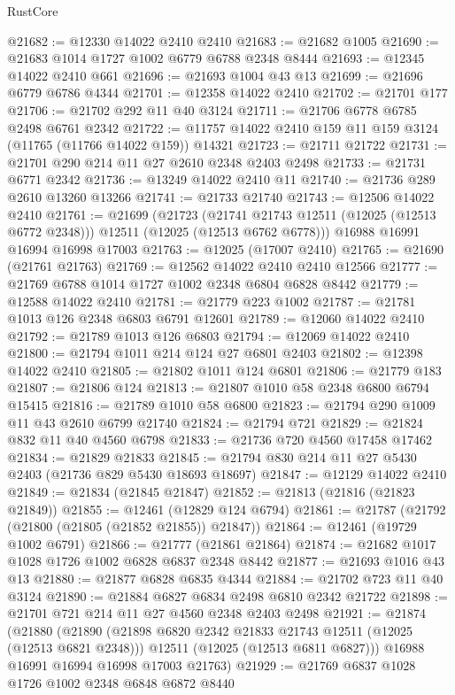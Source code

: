 \begin{lexlean}{RustCore}
\begin{coremodule}
@21682 := @12330 @14022 @2410 @2410
@21683 := @21682 @1005
@21690 := @21683 @1014 @1727 @1002 @6779 @6788 @2348 @8444
@21693 := @12345 @14022 @2410 @661
@21696 := @21693 @1004 @43 @13
@21699 := @21696 @6779 @6786 @4344
@21701 := @12358 @14022 @2410
@21702 := @21701 @177
@21706 := @21702 @292 @11 @40 @3124
@21711 := @21706 @6778 @6785 @2498 @6761 @2342
@21722 := @11757 @14022 @2410 @159 @11 @159 @3124 (@11765 (@11766 @14022 @159)) @14321
@21723 := @21711 @21722
@21731 := @21701 @290 @214 @11 @27 @2610 @2348 @2403 @2498
@21733 := @21731 @6771 @2342
@21736 := @13249 @14022 @2410 @11
@21740 := @21736 @289 @2610 @13260 @13266
@21741 := @21733 @21740
@21743 := @12506 @14022 @2410
@21761 := @21699
    (@21723
      (@21741 @21743 @12511 (@12025 (@12513 @6772 @2348)))
      @12511
      (@12025 (@12513 @6762 @6778)))
    @16988
    @16991
    @16994
    @16998
    @17003
@21763 := @12025 (@17007 @2410)
@21765 := @21690 (@21761 @21763)
@21769 := @12562 @14022 @2410 @2410 @12566
@21777 := @21769 @6788 @1014 @1727 @1002 @2348 @6804 @6828 @8442
@21779 := @12588 @14022 @2410
@21781 := @21779 @223 @1002
@21787 := @21781 @1013 @126 @2348 @6803 @6791 @12601
@21789 := @12060 @14022 @2410
@21792 := @21789 @1013 @126 @6803
@21794 := @12069 @14022 @2410
@21800 := @21794 @1011 @214 @124 @27 @6801 @2403
@21802 := @12398 @14022 @2410
@21805 := @21802 @1011 @124 @6801
@21806 := @21779 @183
@21807 := @21806 @124
@21813 := @21807 @1010 @58 @2348 @6800 @6794 @15415
@21816 := @21789 @1010 @58 @6800
@21823 := @21794 @290 @1009 @11 @43 @2610 @6799 @21740
@21824 := @21794 @721
@21829 := @21824 @832 @11 @40 @4560 @6798
@21833 := @21736 @720 @4560 @17458 @17462
@21834 := @21829 @21833
@21845 := @21794 @830 @214 @11 @27 @5430 @2403 (@21736 @829 @5430 @18693 @18697)
@21847 := @12129 @14022 @2410
@21849 := @21834 (@21845 @21847)
@21852 := @21813 (@21816 (@21823 @21849))
@21855 := @12461 (@12829 @124 @6794)
@21861 := @21787 (@21792 (@21800 (@21805 (@21852 @21855)) @21847))
@21864 := @12461 (@19729 @1002 @6791)
@21866 := @21777 (@21861 @21864)
@21874 := @21682 @1017 @1028 @1726 @1002 @6828 @6837 @2348 @8442
@21877 := @21693 @1016 @43 @13
@21880 := @21877 @6828 @6835 @4344
@21884 := @21702 @723 @11 @40 @3124
@21890 := @21884 @6827 @6834 @2498 @6810 @2342 @21722
@21898 := @21701 @721 @214 @11 @27 @4560 @2348 @2403 @2498
@21921 := @21874
    (@21880
      (@21890
        (@21898 @6820 @2342 @21833 @21743 @12511 (@12025 (@12513 @6821 @2348)))
        @12511
        (@12025 (@12513 @6811 @6827)))
      @16988
      @16991
      @16994
      @16998
      @17003
      @21763)
@21929 := @21769 @6837 @1028 @1726 @1002 @2348 @6848 @6872 @8440

\end{coremodule}
\end{lexlean}
